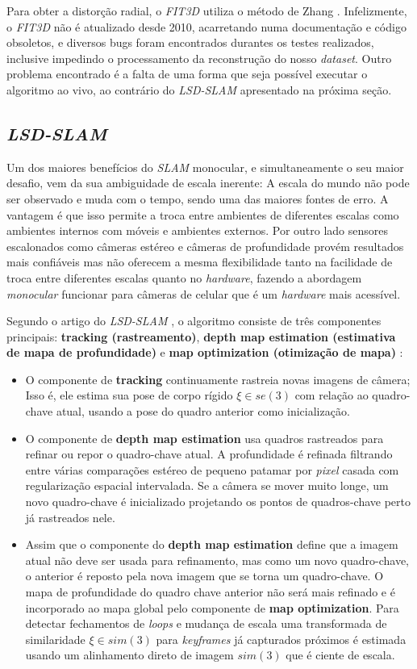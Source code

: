 Para obter a distorção radial, o \textit{FIT3D} utiliza o método de Zhang \cite{FIT3D}. Infelizmente, o \textit{FIT3D} não é atualizado desde 2010, acarretando numa documentação e código obsoletos, e diversos bugs foram encontrados durantes os testes realizados, inclusive impedindo o processamento da reconstrução do nosso \textit{dataset}. Outro problema encontrado é a falta de uma forma que seja possível executar o algoritmo ao vivo, ao contrário do \textit{LSD-SLAM} apresentado na próxima seção.

\subsection{\textit{LSD-SLAM}}

Um dos maiores benefícios do \textit{SLAM} monocular, e simultaneamente o seu maior desafio, vem da sua ambiguidade de escala inerente: A escala do mundo não pode ser observado e muda com o tempo, sendo uma das maiores fontes de erro. A vantagem é que isso permite a troca entre ambientes de diferentes escalas como ambientes internos com móveis e ambientes externos. Por outro lado sensores escalonados como câmeras estéreo e câmeras de profundidade provém resultados mais confiáveis mas não oferecem a mesma flexibilidade tanto na facilidade de troca entre diferentes escalas quanto no \textit{hardware}, fazendo a abordagem \textit{monocular} funcionar para câmeras de celular que é um \textit{hardware} mais acessível. 

Segundo o artigo do \textit{LSD-SLAM} \cite{LSD-SLAM-Artigo}, o algoritmo consiste de três componentes principais: \textbf{tracking (rastreamento)}, \textbf{depth map estimation (estimativa de mapa de profundidade)} e \textbf{map optimization (otimização de mapa)} :

\begin{itemize}
	\item{O componente de \textbf{tracking} continuamente rastreia novas imagens de câmera; Isso é, ele estima sua pose de corpo rígido $\xi \in se(3)$ com relação ao quadro-chave atual, usando a pose do quadro anterior como inicialização.}
	\item{O componente de \textbf{depth map estimation} usa quadros rastreados para refinar ou repor o quadro-chave atual. A profundidade é refinada filtrando entre várias comparações estéreo de pequeno patamar por \textit{pixel} casada com regularização espacial intervalada. Se a câmera se mover muito longe, um novo quadro-chave é inicializado projetando os pontos de quadros-chave perto já rastreados nele.}
	\item{Assim que o componente do \textbf{depth map estimation} define que a imagem atual não deve ser usada para refinamento, mas como um novo quadro-chave, o anterior é reposto pela nova imagem que se torna um quadro-chave. O mapa de profundidade do quadro chave anterior não será mais refinado e é incorporado ao mapa global pelo componente de \textbf{map optimization}. Para detectar fechamentos de \textit{loops} e mudança de escala uma transformada de similaridade $\xi \in sim(3)$ para \textit{keyframes} já capturados próximos é estimada usando um alinhamento direto de imagem $sim(3)$ que é ciente de escala.}
\end{itemize}